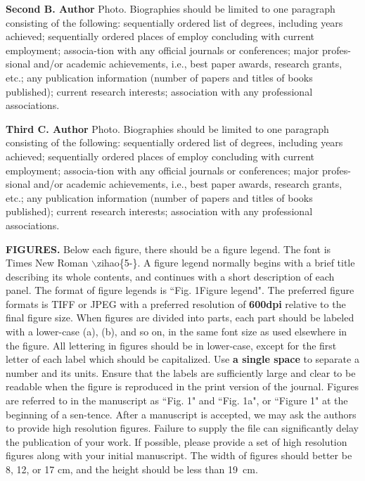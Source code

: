 \documentclass[10.5pt,compsoc]{TsT}
\theoremstyle{mystyle}
\begin{document}
{\begin{thebibliography}{99}
\begin{biography}
\noindent
\textbf{Second B. Author} Photo. Biographies should be limited to one paragraph consisting of the following: sequentially ordered list of degrees, including years achieved; sequentially ordered places of employ concluding with current employment; associa-tion with any official journals or conferences; major profes-sional and/or academic achievements, i.e., best paper awards, research grants, etc.; any publication information (number of papers and titles of books published); current research interests; association with any professional associations.
\end{biography}
\vskip 22mm
\begin{biography}
\noindent
\textbf{Third C. Author}  Photo. Biographies should be limited to one paragraph consisting of the following: sequentially ordered list of degrees, including years achieved; sequentially ordered places of employ concluding with current employment; associa-tion with any official journals or conferences; major profes-sional and/or academic achievements, i.e., best paper awards, research grants, etc.; any publication information (number of papers and titles of books published); current research interests; association with any professional associations.
\end{biography}

\begin{strip}
\end{strip}

\mbox{}
\clearpage
\clearpage
{}
\noindent
\textbf{FIGURES. }Below each figure, there should be a figure legend. The font is Times New Roman $\backslash$zihao\{5-\}. A figure legend normally begins with a brief title describing its whole contents, and continues with a short description of each panel. The format of figure legends is ``Fig. 1\quad Figure legend". The preferred figure formats is TIFF or JPEG with a preferred resolution of \textbf{600dpi} relative to the final figure size. When figures are divided into parts, each part should be labeled with a lower-case (a), (b), and so on, in the same font size as used elsewhere in the figure. All lettering in figures should be in lower-case, except for the first letter of each label which should be capitalized. Use \textbf{a single space} to separate a number and its units. Ensure that the labels are sufficiently large and clear to be readable when the figure is reproduced in the print version of the journal. Figures are referred to in the manuscript as ``Fig. 1" and ``Fig. 1a", or ``Figure 1" at the beginning of a sen-tence. After a manuscript is accepted, we may ask the authors to provide high resolution figures. Failure to supply the file can significantly delay the publication of your work. If possible, please provide a set of high resolution figures along with your initial manuscript. The width of figures should better be 8, 12, or 17 cm, and the height should be less than \mbox{19 cm.}\\


\end{thebibliography}}
\end{document}
